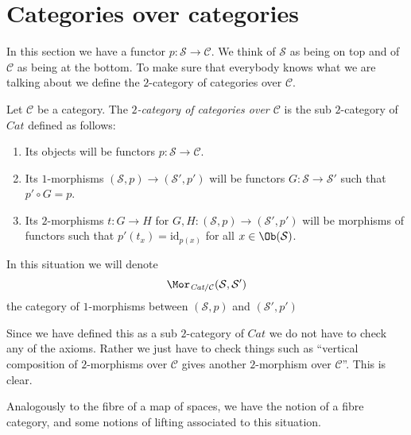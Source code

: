 \section{Categories over categories}
\label{section-categories-over-categories}

\noindent
In this section we have a functor $p : \mathcal{S} \to \mathcal{C}$.
We think of $\mathcal{S}$ as being on top and of $\mathcal{C}$ as being
at the bottom. To make sure that everybody knows what we are talking about
we define the $2$-category of categories over $\mathcal{C}$.

\begin{definition}
\label{definition-categories-over-C}
Let $\mathcal{C}$ be a category.
The {\it $2$-category of categories over $\mathcal{C}$}
is the sub $2$-category of $\textit{Cat}$ defined as follows:
\begin{enumerate}
\item Its objects will be functors $p : \mathcal{S} \to \mathcal{C}$.
\item Its $1$-morphisms $(\mathcal{S}, p) \to (\mathcal{S}', p')$
will be functors $G : \mathcal{S} \to \mathcal{S}'$ such that
$p' \circ G = p$.
\item Its $2$-morphisms $t : G \to H$ for
$G, H : (\mathcal{S}, p) \to (\mathcal{S}', p')$
will be morphisms of functors
such that $p'(t_x) = \text{id}_{p(x)}$
for all $x \in \Ob(\mathcal{S})$.
\end{enumerate}
In this situation we will denote
$$
\Mor_{\textit{Cat}/\mathcal{C}}(\mathcal{S}, \mathcal{S}')
$$
the category of $1$-morphisms between
$(\mathcal{S}, p)$ and $(\mathcal{S}', p')$
\end{definition}

\noindent
Since we have defined this as a sub $2$-category of $\textit{Cat}$
we do not have to check any of the axioms. Rather we just have to check
things such as ``vertical composition of $2$-morphisms over $\mathcal{C}$
gives another $2$-morphism over $\mathcal{C}$''. This is clear.

\medskip\noindent
Analogously to the fibre of a map of spaces, we have the notion of a
fibre category, and some notions of lifting associated to this
situation.

